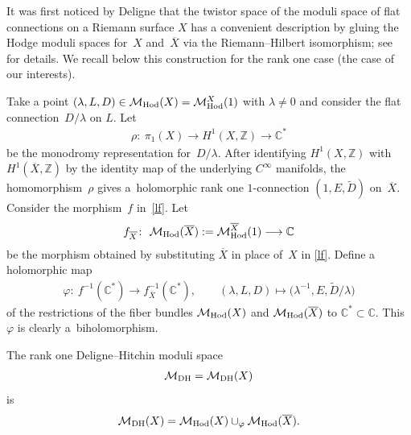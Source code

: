 \documentclass[pdftex]{sigma}
\numberwithin{equation}{section}
\begin{document}
It was f\/irst noticed by Deligne that the twistor space of the moduli space of f\/lat connections on a Riemann surface $X$ has a convenient description by gluing the Hodge moduli spaces for~$X$ and~$\overline X$ via the Riemann--Hilbert isomorphism; see~\cite{Si95,Si08} for details. We recall below this construction for the rank one case (the case of our interests).

Take a point $(\lambda, L, D) \in \mathcal M_{\rm Hod}(X) = \mathcal M^X_{\rm Hod}(1)$ with $\lambda \neq 0$ and consider the f\/lat connec\-tion~$D/\lambda$ on $L$. Let
\begin{gather*}\rho \colon \ \pi_1(X)  \longrightarrow H^1(X, {\mathbb Z}) \longrightarrow \mathbb C^*\end{gather*}
be the monodromy representation for~$D/\lambda$. After identifying $H^1(X, {\mathbb Z})$ with $H^1(\overline{X}, {\mathbb Z})$ by the identity map of the underlying $C^\infty$ manifolds, the homomorphism~$\rho$ gives a~holomorphic rank one $1$-connection $(1, E, \widetilde D)$ on~$\overline{X}$. Consider the morphism~$f$ in~\eqref{lf}. Let
\begin{gather*}
f_{\overline X} \colon \ {\mathcal M}_{\rm Hod}(\overline{X}) := {\mathcal M}^{\overline X}_{\rm Hod}(1)  \longrightarrow {\mathbb C}
\end{gather*}
be the morphism obtained by substituting $\overline X$ in place of~$X$ in \eqref{lf}. Def\/ine a holomorphic map
\begin{gather}\label{hodge-gluing}
\varphi \colon \  f^{-1}({\mathbb C}^*)  \longrightarrow f^{-1}_{\overline X}({\mathbb C}^*) ,\qquad (\lambda, L, D) \longmapsto \big(\lambda^{-1}, E, \widetilde{D}/\lambda\big)
\end{gather}
of the restrictions of the f\/iber bundles ${\mathcal M}_{\rm Hod}(X)$ and ${\mathcal M}_{\rm Hod}(\overline{X})$ to ${\mathbb C}^* \subset \mathbb C$. This $\varphi$ is clearly a~biholomorphism.

\begin{Definition}\label{de1} The rank one Deligne--Hitchin moduli space \begin{gather*}{\mathcal M}_{\rm DH} = {\mathcal M}_{\rm DH}(X)\end{gather*} is
\begin{gather*}{\mathcal M}_{\rm DH}(X) = \mathcal M_{\rm Hod}(X)\cup_\varphi\mathcal M_{\rm Hod}(\overline{X}).\end{gather*}
\end{Definition}
\end{document}
